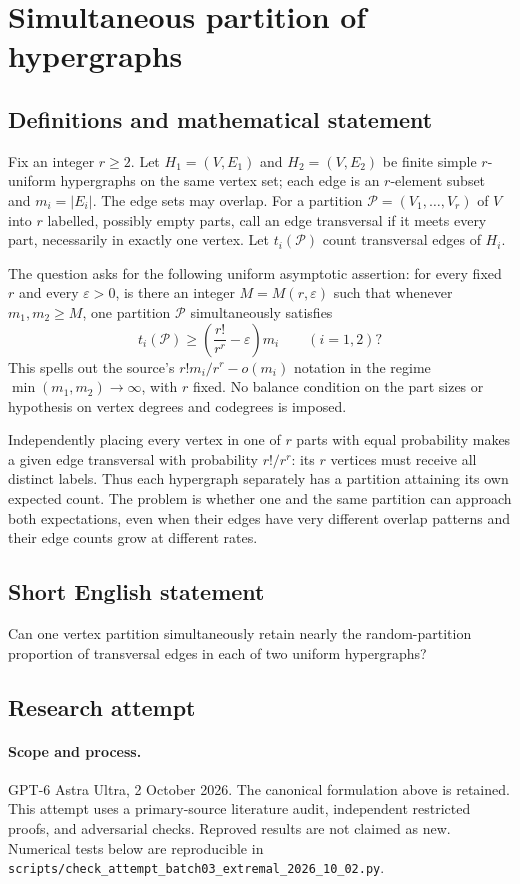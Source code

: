 \documentclass[11pt,a4paper]{article}
\begin{document}
\section*{Simultaneous partition of hypergraphs}\label{statement}

\subsection{Definitions and mathematical statement}
Fix an integer $r\ge2$. Let $H_1=(V,E_1)$ and $H_2=(V,E_2)$ be finite
simple $r$-uniform hypergraphs on the same vertex set; each edge is an
$r$-element subset and $m_i=|E_i|$. The edge sets may overlap. For a
partition $\mathcal P=(V_1,\ldots,V_r)$ of $V$ into $r$ labelled,
possibly empty parts, call an edge transversal if it meets every
part, necessarily in exactly one vertex. Let $t_i(\mathcal P)$ count
transversal edges of $H_i$.

The question asks for the following uniform asymptotic assertion:
for every fixed $r$ and every $\varepsilon>0$, is there an integer
$M=M(r,\varepsilon)$ such that whenever $m_1,m_2\ge M$, one partition
$\mathcal P$ simultaneously satisfies
\[
             t_i(\mathcal P)\ge
             \left(\frac{r!}{r^r}-\varepsilon\right)m_i
                         \qquad(i=1,2)?
\]
This spells out the source's $r!m_i/r^r-o(m_i)$ notation in the regime
$\min(m_1,m_2)\to\infty$, with $r$ fixed. No balance condition on the
part sizes or hypothesis on vertex degrees and codegrees is imposed.

Independently placing every vertex in one of $r$ parts with equal
probability makes a given edge transversal with probability $r!/r^r$:
its $r$ vertices must receive all distinct labels. Thus each hypergraph
separately has a partition attaining its own expected count. The
problem is whether one and the same partition can approach both
expectations, even when their edges have very different overlap
patterns and their edge counts grow at different rates.
\subsection{Short English statement}
Can one vertex partition simultaneously retain nearly the random-partition proportion of transversal edges in each of two uniform hypergraphs?
\subsection{Research attempt}
\paragraph{Scope and process.}
GPT-6 Astra Ultra, 2 October 2026. The canonical formulation above is retained. This attempt uses a primary-source literature audit, independent restricted proofs, and adversarial checks. Reproved results are not claimed as new. Numerical tests below are reproducible in \texttt{scripts/check\_attempt\_batch03\_extremal\_2026\_10\_02.py}.
\end{document}
